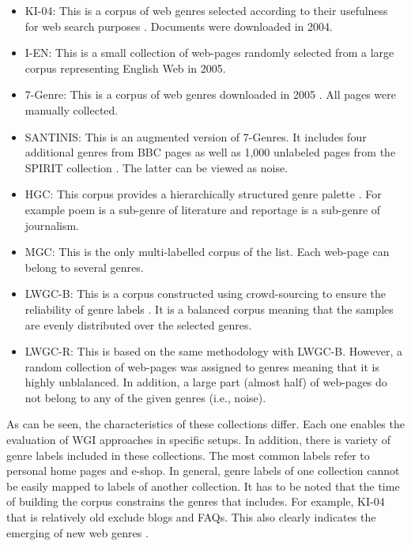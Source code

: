 \begin{itemize}
    \item KI-04: This is a corpus of web genres selected according to their usefulness for web search  purposes \parencite{meyer2004genre}. Documents were downloaded in 2004.
	\item I-EN: This is a small collection of web-pages randomly selected from a large corpus representing English Web in 2005.    
    \item 7-Genre: This is a corpus of web genres downloaded in 2005 \parencite{santini2007automatic}. All pages were manually collected. 
	\item SANTINIS: This is an augmented version of 7-Genres. It includes four additional genres from BBC pages as well as 1,000 unlabeled pages from the SPIRIT collection \parencite{joho2004spirit}. The latter can be viewed as noise.
	\item HGC: This corpus provides a hierarchically structured genre palette  \parencite{stubbe2007genre}. For example poem is a sub-genre of literature and reportage is a sub-genre of journalism.
    \item MGC: This is the only multi-labelled corpus of the list. Each web-page can belong to several genres. \parencite{Vidulin2007}
    \item LWGC-B: This is a corpus constructed using crowd-sourcing to ensure the reliability of genre labels \parencite{Asheghi2015}. It is a balanced corpus meaning that the samples are evenly distributed over the selected genres.
    \item LWGC-R: This is based on the same methodology with LWGC-B. However, a random collection of web-pages was assigned to genres meaning that it is highly unblalanced. In addition, a large part (almost half) of web-pages do not belong to any of the given genres (i.e., noise).
\end{itemize}

As can be seen, the characteristics of these collections differ. Each one enables the evaluation of WGI approaches in specific setups. In addition, there is variety of genre labels included in these collections. The most common labels refer to personal home pages and e-shop. In general, genre labels of one collection cannot be easily mapped to labels of another collection. It has to be noted that the time of building the corpus constrains the genres that includes. For example, KI-04 that is relatively old exclude blogs and FAQs. This also clearly indicates the emerging of new web genres \parencite{dash2018history}. 

